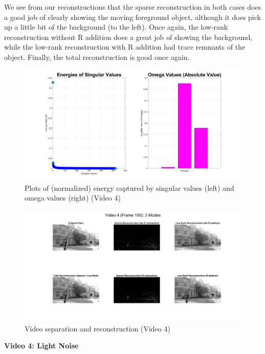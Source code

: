 \documentclass{article}
\begin{document}
We see from our reconstructions that the sparse reconstruction in both cases does a good job of clearly showing the moving foreground object, although it does pick up a little bit of the background (to the left). Once again, the low-rank reconstruction without R addition does a great job of showing the background, while the low-rank reconstruction with R addition had trace remnants of the object. Finally, the total reconstruction is good once again.

\begin{figure}[H]
\begin{center}
\includegraphics[width = 12cm]{energy4}
\caption{\label{fig:scaled_diss} Plots of (normalized) energy captured by singular values (left) and omega values (right) (Video 4)}
\end{center}
\end{figure}
\begin{figure}[H]
\begin{center}
\includegraphics[width = 16cm]{vid4image}
\caption{\label{fig:scaled_diss} Video separation and reconstruction (Video 4)}
\end{center}
\end{figure}
\textbf{Video 4: Light Noise} \\ \\
\end{document}
